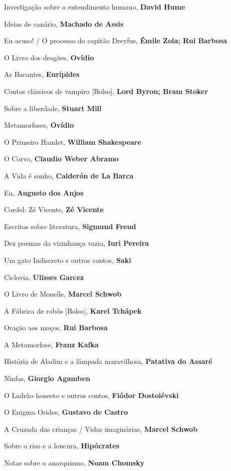 \begin{multicols}{2}
\begin{enumerate}
{\item Investigação sobre o entendimento humano, \textbf{David Hume}
\item Ideias de canário, \textbf{Machado de Assis}
\item Eu acuso! / O processo do capitão Dreyfus, \textbf{Émile Zola; Rui Barbosa}
\item O Livro dos dragões, \textbf{Ovídio}
\item As Bacantes, \textbf{Eurípides}
\item Contos clássicos de vampiro [Bolso], \textbf{Lord Byron; Bram Stoker}
\item Sobre a liberdade, \textbf{Stuart Mill}
\item Metamorfoses, \textbf{Ovídio}
\item O Primeiro Hamlet, \textbf{William Shakespeare}
\item O Corvo, \textbf{Claudio Weber Abramo}
\item A Vida é sonho, \textbf{Calderón de La Barca}
\item Eu, \textbf{Augusto dos Anjos}
\item Cordel: Zé Vicente, \textbf{Zé Vicente}
\item Escritos sobre literatura, \textbf{Sigmund Freud}
\item Dez poemas da vizinhança vazia, \textbf{Iuri Pereira}
\item Um gato Indiscreto e outros contos, \textbf{Saki}
\item Ciclovia, \textbf{Ulisses Garcez}
\item O Livro de Monelle, \textbf{Marcel Schwob}
\item A Fábrica de robôs [Bolso], \textbf{Karel Tchápek}
\item Oração aos moços, \textbf{Rui Barbosa}
\item A Metamorfose, \textbf{Franz Kafka}
\item História de Aladim e a lâmpada maravilhosa, \textbf{Patativa do Assaré}
\item Ninfas, \textbf{Giorgio Agamben}
\item O Ladrão honesto e outros contos, \textbf{Fiódor Dostoiévski}
\item O Enigma Orides, \textbf{Gustavo de Castro}
\item A Cruzada das crianças / Vidas imaginárias, \textbf{Marcel Schwob}
\item Sobre o riso e a loucura, \textbf{Hipócrates}
\item Notas sobre o anarquismo, \textbf{Noam Chomsky}
}
\end{enumerate}
\end{multicols}
